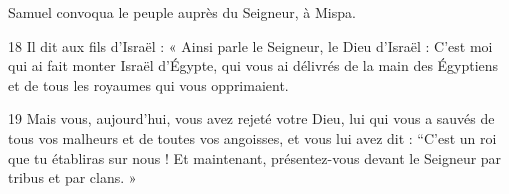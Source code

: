  Samuel convoqua le peuple auprès du Seigneur, à Mispa.

18 Il dit aux fils d’Israël : « Ainsi parle le Seigneur, le Dieu d’Israël : C’est moi qui ai fait monter Israël d’Égypte, qui vous ai délivrés de la main des Égyptiens et de tous les royaumes qui vous opprimaient.

19 Mais vous, aujourd’hui, vous avez rejeté votre Dieu, lui qui vous a sauvés de tous vos malheurs et de toutes vos angoisses, et vous lui avez dit : “C’est un roi que tu établiras sur nous ! Et maintenant, présentez-vous devant le Seigneur par tribus et par clans. »
